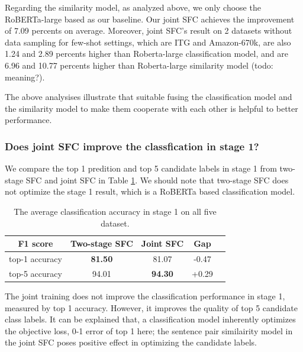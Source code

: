 \documentclass[letterpaper]{article} %
\providecommand{\tabularnewline}{\\}
\begin{document}
  Regarding  the  similarity  model,  as  analyzed  above,  we  only  choose the
  RoBERTa-large based as our baseline. Our joint SFC achieves the improvement of
  7.09  percents  on average. Moreover, joint SFC's result on 2 datasets without
  data  sampling  for few-shot settings, which are ITG and Amazon-670k, are also
  1.24 and 2.89 percents higher than Roberta-large classification model, and are
  6.96 and 10.77 percents higher than Roberta-large similarity model (todo:
  meaning?).

  The above analysises illustrate that suitable fusing the classification model and the 
  similarity model to make them cooperate with each other is helpful to better
  performance.  

  \subsubsection*{Does joint SFC improve the classfication in stage 1?}
  We  compare  the  top  1  predition and top 5 candidate labels in stage 1 from
  two-stage SFC and joint SFC in Table \ref{tbe:top1_5_accuracy}. We should note
  that  two-stage  SFC  does not optimize the stage 1 result, which is a RoBERTa
  based classification model.

  \begin{table}
    \begin{centering}
      \begin{tabular}{|c|c|c|c|c|}
        \hline
        F1 score & Two-stage SFC & Joint SFC & Gap & \tabularnewline
        \hline
        top-1 accuracy  & \textbf{81.50} & 81.07 & -0.47 & \tabularnewline
        top-5 accuracy & 94.01 & \textbf{94.30} & +0.29 & \tabularnewline
        \hline
      \end{tabular}
      \par
    \end{centering}
    \caption{The average classification accuracy in stage 1 on all five dataset.}
    \label{tbe:top1_5_accuracy}
  \end{table}

  The joint training does not improve the classification performance in stage 1,
  measured  by  top  1  accuracy.  However,  it  improves  the  quality of top 5
  candidate  class  labels.  It  can  be  explained that, a classification model
  inherently optimizes the objective loss, 0-1 error of top 1 here; the sentence
  pair similairity model in the joint SFC poses positive effect in optimizing the 
  candidate labels.
\end{document}
